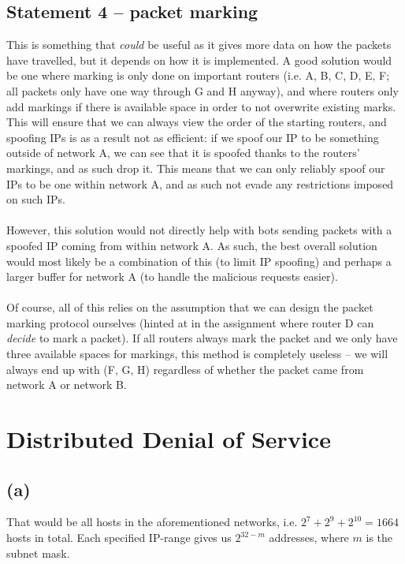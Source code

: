 \documentclass{article}
\begin{document}
\subsection*{Statement 4 -- packet marking}

This is something that \textit{could} be useful as it gives more data on how the packets have travelled, but it depends on how it is implemented. A good solution would be one where marking is only done on important routers (i.e. A, B, C, D, E, F; all packets only have one way through G and H anyway), and where routers only add markings if there is available space in order to not overwrite existing marks.
This will ensure that we can always view the order of the starting routers, and spoofing IPs is as a result not as efficient: if we spoof our IP to be something outside of network A, we can see that it is spoofed thanks to the routers' markings, and as such drop it. This means that we can only reliably spoof our IPs to be one within network A, and as such not evade any restrictions imposed on such IPs.
\\
\\
However, this solution would not directly help with bots sending packets with a spoofed IP coming from within network A. As such, the best overall solution would most likely be a combination of this (to limit IP spoofing) and perhaps a larger buffer for network A (to handle the malicious requests easier).
\\
\\
Of course, all of this relies on the assumption that we can design the packet marking protocol ourselves (hinted at in the assignment where router D can \textit{decide} to mark a packet). If all routers always mark the packet and we only have three available spaces for markings, this method is completely useless -- we will always end up with (F, G, H) regardless of whether the packet came from network A or network B.

\newpage
\section{Distributed Denial of Service}

\subsection*{(a)}
That would be all hosts in the aforementioned networks, i.e. $2^7+2^9+2^{10}=1664$ hosts in total.
Each specified IP-range gives us $2^{32-m}$ addresses, where $m$ is the subnet mask.
\end{document}

